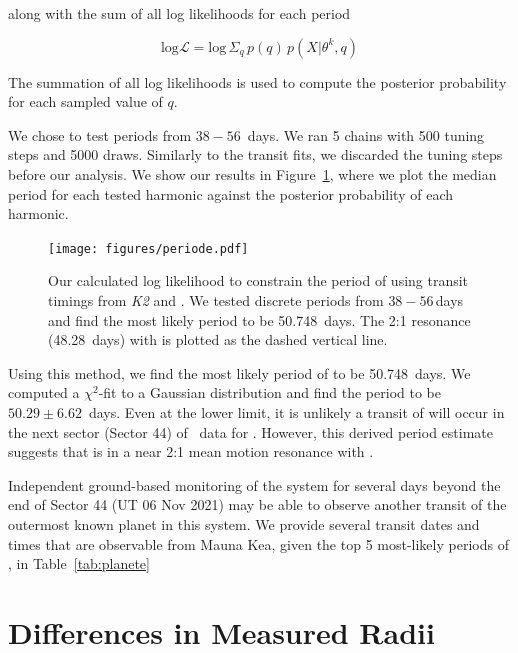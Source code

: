 \documentclass[twocolumn]{aastex631}
\begin{document}
along with the sum of all log likelihoods for each period 

\begin{equation}
    \textrm{log} \mathcal{L} = \textrm{log}\, \Sigma_q\, p(q)\, p(X|\theta^k, q) 
\end{equation}

The summation of all log likelihoods is used to compute the posterior probability for each sampled value of $q$.

We chose to test periods from $38-56$~days. We ran 5 chains with 500 tuning steps and 5000 draws. Similarly to the transit fits, we discarded the tuning steps before our analysis. We show our results in Figure~\ref{fig:period_e}, where we plot the median period for each tested harmonic against the posterior probability of each harmonic.

\begin{figure}[!ht]
\begin{center}
\texttt{[image: figures/periode.pdf]}
\caption{Our calculated log likelihood to constrain the period of \planete using transit timings from \textit{K2} and \tess. We tested discrete periods from $38-56$\,days and find the most likely period to be 50.748~days. The 2:1 resonance (48.28~days) with \planetb is plotted as the dashed vertical line.} \label{fig:period_e}
\end{center}
\end{figure}

Using this method, we find the most likely period of \planete to be 50.748~days. We computed a $\chi^2$-fit to a Gaussian distribution and find the period to be $50.29 \pm 6.62$~days. Even at the lower limit, it is unlikely a transit of \planete will occur in the next sector (Sector 44) of \tess\ data for \sname. However, this derived period estimate suggests that \planete is in a near 2:1 mean motion resonance with \planetb.

Independent ground-based monitoring of the system for several days beyond the end of Sector 44 (UT 06 Nov 2021) may be able to observe another transit of the outermost known planet in this system. We provide several transit dates and times that are observable from Mauna Kea, given the top 5 most-likely periods of \planete, in Table~\ref{tab:planete}

\section{Differences in Measured Radii} \label{sec:radii}
\end{document}
